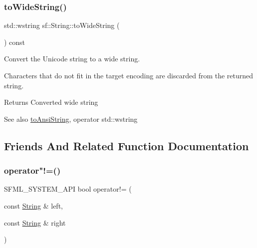 \subsubsection{\texorpdfstring{toWideString()}{toWideString()}}
{\footnotesize\ttfamily std\+::wstring sf\+::\+String\+::to\+Wide\+String (\begin{DoxyParamCaption}{ }\end{DoxyParamCaption}) const}



Convert the Unicode string to a wide string. 

Characters that do not fit in the target encoding are discarded from the returned string.

\begin{DoxyReturn}{Returns}
Converted wide string
\end{DoxyReturn}
\begin{DoxySeeAlso}{See also}
\mbox{\hyperlink{classsf_1_1_string_ada5d5bba4528aceb0a1e298553e6c30a}{to\+Ansi\+String}}, operator std\+::wstring \begin{DoxyVerb}\end{DoxyVerb}
 
\end{DoxySeeAlso}


\subsection{Friends And Related Function Documentation}
\mbox{\label{classsf_1_1_string_a2b592c36be218b4811795fdc84eecc69}} 
\subsubsection{\texorpdfstring{operator"!=()}{operator!=()}}
{\footnotesize\ttfamily S\+F\+M\+L\+\_\+\+S\+Y\+S\+T\+E\+M\+\_\+\+A\+PI bool operator!= (\begin{DoxyParamCaption}\item[{const \mbox{\hyperlink{classsf_1_1_string}{String}} \&}]{left,  }\item[{const \mbox{\hyperlink{classsf_1_1_string}{String}} \&}]{right }\end{DoxyParamCaption})\hspace{0.3cm}{\ttfamily [related]}}



